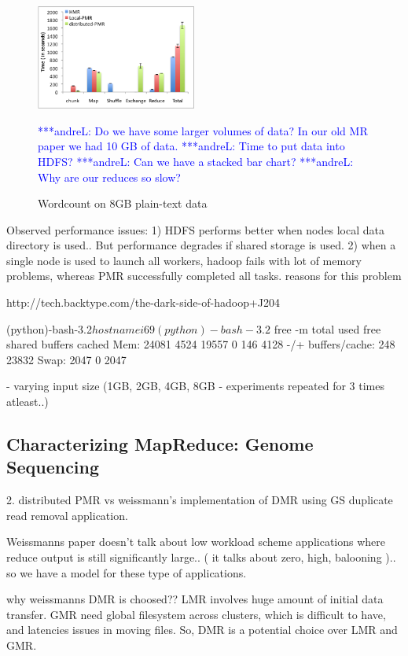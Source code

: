 \documentclass{acm_proc_article-sp}
\newcommand{\alnote}[1]{ {\textcolor{blue} { ***andreL: #1 }}}
\newcommand{\alnote}[1]{}
\begin{document}
\begin{figure}[compMR_8GB]
	\centering
		\includegraphics[width=0.47\textwidth]{figures/comparision_8gb.png}
	\caption{Wordcount on 8GB plain-text data}
	\alnote{Do we have some larger volumes of data? In our old MR paper we
	had 10 GB of data.}
	\alnote{Time to put data into HDFS?}
	\alnote{Can we have a stacked bar chart?}
	\alnote{Why are our reduces so slow?}
	\label{fig:figures_compMR_8GB}
\end{figure}


Observed performance issues:
1) HDFS performs better when nodes local data directory is used.. But performance degrades if shared storage is used. 			
2) when a single node is used to launch all workers, hadoop fails with lot of memory problems, whereas PMR successfully completed all tasks.			
reasons for this problem

http://tech.backtype.com/the-dark-side-of-hadoop+J204		

(python)-bash-3.2$ hostname
i69
(python)-bash-3.2$ free -m
                  total          used       free     shared    buffers     cached
Mem:         24081       4524      19557          0        146       4128
-/+ buffers/cache:       248      23832
Swap:         2047          0       2047
	

         - varying input size (1GB, 2GB, 4GB, 8GB - experiments repeated for 3 times atleast..)

  


\subsection{Characterizing MapReduce: Genome Sequencing}

2. distributed PMR vs weissmann's implementation of  DMR using GS duplicate read removal application.

Weissmanns paper doesn't talk about low workload scheme applications where reduce output is still significantly large.. ( it talks about zero, high, balooning ).. so we have a model for these type of applications.

why weissmanns DMR is choosed?? LMR involves huge amount of initial data transfer. GMR need global filesystem across clusters, which is difficult to have, and latencies issues in moving files. So, DMR is a potential choice over LMR and GMR. 
\end{document}
